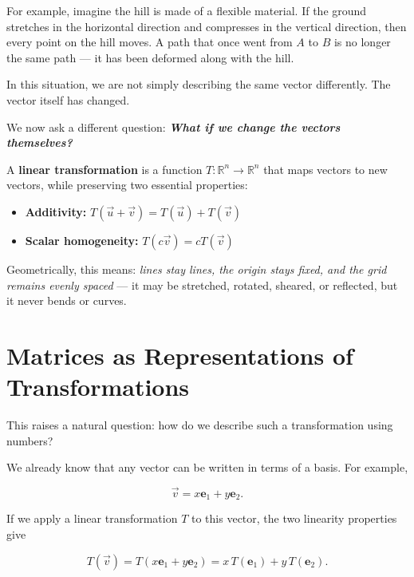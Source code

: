 \documentclass[11pt,openany]{book}
\theoremstyle{definition}
\begin{document}
\medskip

For example, imagine the hill is made of a flexible material. If the ground stretches
in the horizontal direction and compresses in the vertical direction, then every point
on the hill moves. A path that once went from $A$ to $B$ is no longer the same path ---
it has been deformed along with the hill.

\medskip

In this situation, we are not simply describing the same vector differently.
The vector itself has changed.

\medskip



We now ask a different question: \textbf{\textit{What if we change the vectors themselves?}}


\medskip

A \textbf{linear transformation} is a function $T: \mathbb{R}^n \to \mathbb{R}^n$ that maps vectors
to new vectors, while preserving two essential properties:

\begin{itemize}
  \item \textbf{Additivity:} $T(\vec{u} + \vec{v}) = T(\vec{u}) + T(\vec{v})$
  \item \textbf{Scalar homogeneity:} $T(c\vec{v}) = cT(\vec{v})$
\end{itemize}

Geometrically, this means: \textit{lines stay lines, the origin stays fixed, and the grid
remains evenly spaced} --- it may be stretched, rotated, sheared, or reflected, but it
never bends or curves.

\section{Matrices as Representations of Transformations}

This raises a natural question: how do we describe such a transformation using numbers?

\medskip

We already know that any vector can be written in terms of a basis. For example,

\[
\vec{v} = x\mathbf{e}_1 + y\mathbf{e}_2.
\]

If we apply a linear transformation $T$ to this vector, the two linearity properties give

\[
T(\vec{v}) = T(x\mathbf{e}_1 + y\mathbf{e}_2) = x\,T(\mathbf{e}_1) + y\,T(\mathbf{e}_2).
\]
\end{document}
